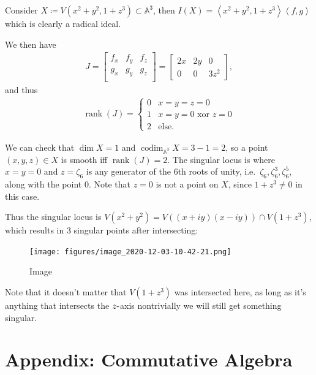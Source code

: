 \begin{example}[?]

Consider \(X\coloneqq V(x^2 + y^2, 1+z^3) \subset{\mathbb{A}}^3\), then
\(I(X) = \left\langle{x^2 + y^2, 1 + z^3}\right\rangle \left\langle{f, g}\right\rangle\)
which is clearly a radical ideal.

We then have
\begin{align*}  
J = 
\begin{bmatrix}
f_x & f_y & f_z \\
g_x & g_y & g_z \\
\end{bmatrix}
=
\begin{bmatrix}
2x & 2y & 0 \\
0 & 0 & 3z^2
\end{bmatrix}
,\end{align*}
and thus
\begin{align*}  
\operatorname{rank}(J) = 
\begin{cases}
0 & x=y=z=0 \\
1 & x=y=0 \text{ xor } z=0 \\
2 & \text{else}.
\end{cases}
\end{align*}

We can check that \(\dim X = 1\) and
\(\operatorname{codim}_{{\mathbb{A}}^3} X = 3-1 = 2\), so a point
\((x,y,z) \in X\) is smooth iff \(\operatorname{rank}(J) = 2\). The
singular locus is where \(x=y=0\) and \(z= \zeta_6\) is any generator of
the 6th roots of unity, i.e.~\(\zeta_6, \zeta_6^3, \zeta_6^5\), along
with the point \(0\). Note that \(z=0\) is not a point on \(X\), since
\(1+z^3\neq 0\) in this case.

Thus the singular locus is
\(V(x^2 + y^2) = V((x+iy)(x-iy)) \cap V(1+z^3)\), which results in 3
singular points after intersecting:

\begin{figure}
\centering
\texttt{[image: figures/image\_2020-12-03-10-42-21.png]}
\caption{Image}
\end{figure}

Note that it doesn't matter that \(V(1+z^3)\) was intersected here, as
long as it's anything that intersects the \(z{\hbox{-}}\)axis
nontrivially we will still get something singular.

\end{example}

\hypertarget{appendix-commutative-algebra}{%
\section*{Appendix: Commutative
Algebra}\label{appendix-commutative-algebra}}


